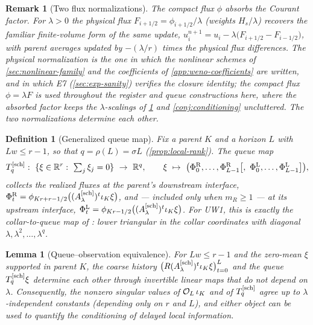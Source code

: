 \documentclass[pdflatex,sn-mathphys-num]{sn-jnl}%
\theoremstyle{thmstyleone}%
\newtheorem{lemma}{Lemma}%
\theoremstyle{thmstyletwo}%
\newtheorem{remark}{Remark}%
\theoremstyle{thmstylethree}%
\newtheorem{definition}{Definition}%
\newcommand{\R}{\mathbb R}
\newcommand{\OL}{{\cal O}_L}
\newcommand{\Asch}{A^{[\rm sch]}_\lambda}
\begin{document}
\begin{remark}[Two flux normalizations]\label{rem:flux-normalization}
The \emph{compact} flux $\phi$ absorbs the Courant factor.
For $\lambda>0$ the \emph{physical} flux $F_{i+1/2}=\phi_{i+1/2}/\lambda$ (weights $H_s/\lambda$) recovers the familiar finite-volume form of the same update, $u_i^{n+1}=u_i-\lambda\bigl(F_{i+1/2}-F_{i-1/2}\bigr)$, with parent averages updated by $-(\lambda/r)$ times the physical flux differences.
The physical normalization is the one in which the nonlinear schemes of \cref{sec:nonlinear-family} and the coefficients of \cref{app:weno-coefficients} are written, and in which E7 (\cref{sec:exp-sanity}) verifies the closure identity; the compact flux $\phi=\lambda F$ is used throughout the register and queue constructions here, where the absorbed factor keeps the $\lambda$-scalings of \cref{def:queue-map} and \cref{conj:conditioning} uncluttered.
The two normalizations determine each other.
\end{remark}

\begin{definition}[Generalized queue map]\label{def:queue-map}
Fix a parent $K$ and a horizon $L$ with $Lw\le r-1$, so that $q=\rho(L)=\sigma L$ (\cref{prop:local-rank}).
The queue map \[ T^{[\rm sch]}_q:\ \{\xi\in\R^r:\ \textstyle\sum_j\xi_j=0\}\ \to\ \R^{q}, \qquad \xi\ \mapsto\ \bigl(\Phi^{\rm R}_0,\ldots,\Phi^{\rm R}_{L-1} \bigl[,\ \Phi^{\rm L}_0,\ldots,\Phi^{\rm L}_{L-1}\bigr]\bigr), \] collects the realized fluxes at the parent's downstream interface, $\Phi^{\rm R}_t=\phi_{Kr+r-1/2}\bigl((\Asch)^t\iota_K\xi\bigr)$, and --- included only when $m_R\ge1$ --- at its upstream interface, $\Phi^{\rm L}_t=\phi_{Kr-1/2}\bigl((\Asch)^t\iota_K\xi\bigr)$.
For UW1, this is exactly the collar-to-queue map of \cite{PolemitisChristakisDrikakis2026FVerasure}: lower triangular in the collar coordinates with diagonal $\lambda,\lambda^2,\ldots,\lambda^q$.
\end{definition}

\begin{lemma}[Queue--observation equivalence]\label{lem:queue-equivalence}
For $Lw\le r-1$ and the zero-mean $\xi$ supported in parent $K$, the coarse history $\bigl(R(\Asch)^t\iota_K\xi\bigr)_{t=0}^{L}$ and the queue $T^{[\rm sch]}_q\xi$ determine each other through invertible linear maps that do not depend on $\lambda$.
Consequently, the nonzero singular values of $\OL\,\iota_K$ and of $T^{[\rm sch]}_q$ agree up to $\lambda$-independent constants (depending only on $r$ and $L$), and either object can be used to quantify the conditioning of delayed local information.
\end{lemma}
\end{document}
